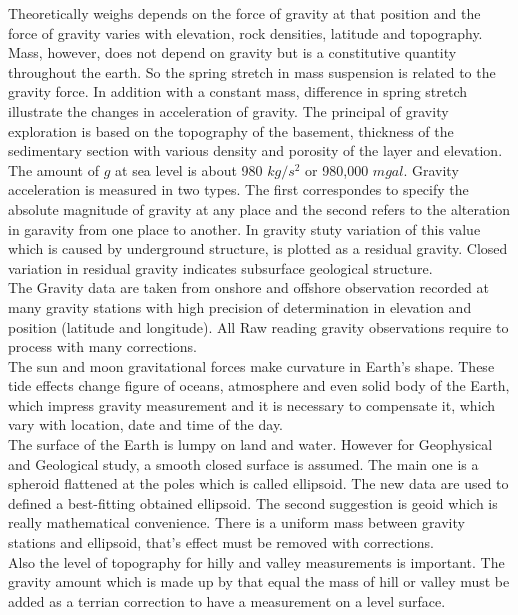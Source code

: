 Theoretically weighs depends on the force of gravity at that position and the force of gravity varies with elevation, rock densities, latitude and topography. Mass, however, does not depend on gravity but is a constitutive quantity throughout the earth. So the spring stretch in mass suspension is related to the gravity force. In addition with a constant mass, difference in spring stretch illustrate the changes in acceleration of gravity. The principal of gravity exploration is based on the topography of the basement, thickness of the sedimentary section with various density and porosity of the layer and elevation.\\
The amount of $g$ at sea level is about 980 $kg/s^2$ or 980,000 $mgal$. Gravity acceleration is measured in two types. The first correspondes to specify the absolute magnitude of gravity at any place and the second refers to the alteration in garavity from one place to another. In gravity stuty variation of this value which is caused by underground structure, is plotted as a residual gravity. Closed variation in residual gravity indicates subsurface geological structure.\\
The Gravity data are taken from onshore and offshore observation recorded at many gravity stations with high precision of determination in elevation and position (latitude and longitude). All Raw reading gravity observations require to process with many corrections.\\
The sun and moon gravitational forces make curvature in Earth's shape. These tide effects change figure of oceans, atmosphere and even solid body of the Earth, which impress gravity measurement and it is necessary to compensate it, which vary with location, date and time of the day.\\
The surface of the Earth is lumpy on land and water. However for Geophysical and Geological study, a smooth closed surface is assumed. The main one is a spheroid flattened at the poles which is called ellipsoid. The new data are used to defined a best-fitting obtained ellipsoid. The second suggestion is geoid which is really mathematical convenience. There is a uniform mass between gravity stations and ellipsoid, that's effect must be removed with corrections.\\ 
Also the level of topography for hilly and valley measurements is important. The gravity amount which is made up by that equal the mass of hill or valley must be added as a terrian correction to have a measurement on a level surface.\\
